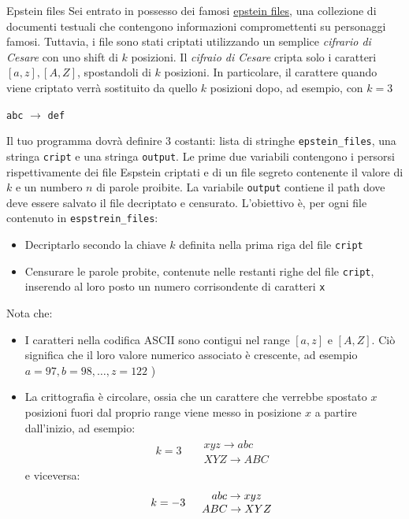 \tikzexternaldisable
\begin{esercizioL}{Epstein files}
	Sei entrato in possesso dei famosi \href{https://en.wikipedia.org/wiki/Epstein_files}{epstein files}, una collezione di documenti testuali che contengono informazioni compromettenti su personaggi famosi. Tuttavia, i file sono stati criptati utilizzando un semplice \textit{cifrario di Cesare} con uno shift di $ k $ posizioni. Il \textit{cifraio di Cesare} cripta solo i caratteri $ \left[a, z\right], \left[A, Z\right] $, spostandoli di $ k $ posizioni. In particolare, il carattere quando viene criptato verrà sostituito da quello $ k $ posizioni dopo, ad esempio, con $ k=3 $
	\begin{center}
		\verb|abc| $ \rightarrow $ \verb|def|
	\end{center}
	Il tuo programma dovrà definire 3 costanti: lista di stringhe \verb|epstein_files|, una stringa \verb|cript| e una stringa \verb|output|. Le prime due variabili contengono i persorsi rispettivamente dei file Espstein criptati e di un file segreto contenente il valore di $ k $ e un numbero $ n $ di parole proibite. La variabile \verb|output| contiene il path dove deve essere salvato il file decriptato e censurato. L'obiettivo è, per ogni file contenuto in \verb|espstrein_files|:
	\begin{itemize}
		\item Decriptarlo secondo la chiave $ k $ definita nella prima riga del file \verb|cript|
		\item Censurare le parole probite, contenute nelle restanti righe del file \verb|cript|, inserendo al loro posto un numero corrisondente di caratteri \verb|x|
	\end{itemize}
	Nota che:
	\begin{itemize}
		\item I caratteri nella codifica ASCII sono contigui nel range $ \left[a, z\right] $ e  $ \left[A, Z\right] $. Ciò significa che il loro valore numerico associato è crescente, ad esempio $ a = 97, b = 98, \ldots, z = 122 $ )
		\item La crittografia è circolare, ossia che un carattere che verrebbe spostato $ x $ posizioni fuori dal proprio range viene messo in posizione $ x $ a partire dall'inizio, ad esempio:
		      \begin{align*}
			      k=3 &  & \begin{array}{cc}
				               xyz \rightarrow abc \\
				               XYZ \rightarrow ABC
			               \end{array}
		      \end{align*}
		      e viceversa:
		      \begin{align*}
			      k=-3 &  &
			      \begin{array}{c c}
				      abc \rightarrow xyz \\
				      ABC \rightarrow XYZ
			      \end{array}
		      \end{align*}
	\end{itemize}


\end{esercizioL}
